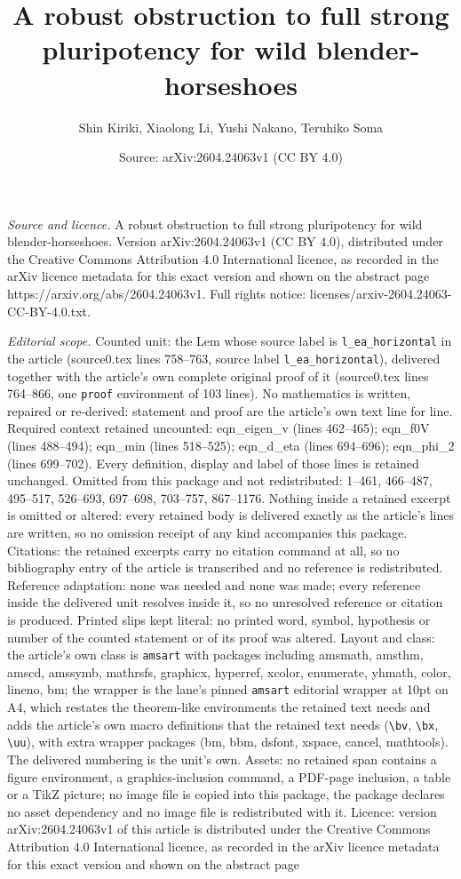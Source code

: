\documentclass[10pt,a4paper]{amsart}
\title[A robust obstruction to full strong pluripotency for wild bl]{A robust obstruction to full strong pluripotency for wild blender-horseshoes}
\author{Shin Kiriki, Xiaolong Li, Yushi Nakano, Teruhiko Soma}
\date{Source: arXiv:2604.24063v1 (CC BY 4.0)}
\begin{document}
\maketitle

\noindent\emph{Source and licence.} A robust obstruction to full strong pluripotency for wild blender-horseshoes. Version arXiv:2604.24063v1 (CC BY 4.0), distributed under the Creative Commons Attribution 4.0 International licence, as recorded in the arXiv licence metadata for this exact version and shown on the abstract page https://arxiv.org/abs/2604.24063v1. Full rights notice: licenses/arxiv-2604.24063-CC-BY-4.0.txt.\par\smallskip

\noindent\textit{Editorial scope.} Counted unit: the Lem whose source label is \texttt{l\_ea\_horizontal} in the article (source0.tex lines 758--763, source label \texttt{l\_ea\_horizontal}), delivered together with the article's own complete original proof of it (source0.tex lines 764--866, one \texttt{proof} environment of 103 lines). No mathematics is written, repaired or re-derived: statement and proof are the article's own text line for line. Required context retained uncounted: eqn\_eigen\_v (lines 462--465); eqn\_f0V (lines 488--494); eqn\_min (lines 518--525); eqn\_d\_eta (lines 694--696); eqn\_phi\_2 (lines 699--702). Every definition, display and label of those lines is retained unchanged. Omitted from this package and not redistributed: 1--461, 466--487, 495--517, 526--693, 697--698, 703--757, 867--1176. Nothing inside a retained excerpt is omitted or altered: every retained body is delivered exactly as the article's lines are written, so no omission receipt of any kind accompanies this package. Citations: the retained excerpts carry no citation command at all, so no bibliography entry of the article is transcribed and no reference is redistributed. Reference adaptation: none was needed and none was made; every reference inside the delivered unit resolves inside it, so no unresolved reference or citation is produced. Printed slips kept literal: no printed word, symbol, hypothesis or number of the counted statement or of its proof was altered. Layout and class: the article's own class is \texttt{amsart} with packages including amsmath, amsthm, amscd, amssymb, mathrsfs, graphicx, hyperref, xcolor, enumerate, yhmath, color, lineno, bm; the wrapper is the lane's pinned \texttt{amsart} editorial wrapper at 10pt on A4, which restates the theorem-like environments the retained text needs and adds the article's own macro definitions that the retained text needs (\texttt{\textbackslash bv}, \texttt{\textbackslash bx}, \texttt{\textbackslash uu}), with extra wrapper packages (bm, bbm, dsfont, xspace, cancel, mathtools). The delivered numbering is the unit's own. Assets: no retained span contains a figure environment, a graphics-inclusion command, a PDF-page inclusion, a table or a TikZ picture; no image file is copied into this package, the package declares no asset dependency and no image file is redistributed with it. Licence: version arXiv:2604.24063v1 of this article is distributed under the Creative Commons Attribution 4.0 International licence, as recorded in the arXiv licence metadata for this exact version and shown on the abstract page 
\end{document}
